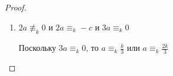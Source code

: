 \documentclass[12pt]{article}
\begin{document}
\begin{proof}
\begin{enumerate}
			\item $2a \not \equiv_k 0$ и $2a \equiv_k -c$ и $3a \equiv_k 0$
			
			Поскольку $3a \equiv_k 0$, то $a \equiv_k \frac{k}{3}$ или $a \equiv_k \frac{2k}{3}$
		\end{enumerate}
	\end{proof}
\end{document}
